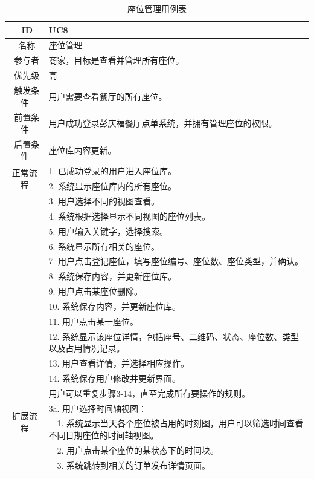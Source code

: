 \begin{table}[htbp!]
  \footnotesize
  \centering
  \caption{座位管理用例表}
  \vspace{2mm}
  \begin{tabular}{cp{11.5cm}}
   \hline
   \ ID & UC8 \\ 
   \hline
   \ 名称 & 座位管理 \\ 
   \hline
   \ 参与者 & 商家，目标是查看并管理所有座位。 \\ 
   \hline
   \ 优先级 & 高 \\ 
   \hline
   \ 触发条件 & 用户需要查看餐厅的所有座位。 \\ 
   \hline
   \ 前置条件 & 用户成功登录彭庆福餐厅点单系统，并拥有管理座位的权限。 \\ 
   \hline
   \ 后置条件 & 座位库内容更新。 \\ 
   \hline
   \multirow{2}{*}{正常流程}
    & 1.	已成功登录的用户进入座位库。\\
    & 2.	系统显示座位库内的所有座位。\\
    & 3.	用户选择不同的视图查看。\\
    & 4.	系统根据选择显示不同视图的座位列表。\\
    & 5.  用户输入关键字，选择搜索。\\
    & 6.  系统显示所有相关的座位。\\
    & 7.  用户点击登记座位，填写座位编号、座位数、座位类型，并确认。\\
    & 8.  系统保存内容，并更新座位库。\\
    & 9.	用户点击某座位删除。\\
    & 10.	系统保存内容，并更新座位库。\\
    & 11.  用户点击某一座位。\\
    & 12.  系统显示该座位详情，包括座号、二维码、状态、座位数、类型以及占用情况记录。\\
    & 13.  用户查看详情，并选择相应操作。\\
    & 14.  系统保存用户修改并更新界面。\\
    & 用户可以重复步骤3-14，直至完成所有要操作的规则。\\
   \hline
   \multirow{2}{*}{扩展流程}
    & 3a. 用户选择时间轴视图：\\
    & ~~1.	系统显示当天各个座位被占用的时刻图，用户可以筛选时间查看不同日期座位的时间轴视图。\\
    & ~~2.	用户点击某个座位的某状态下的时间块。\\
    & ~~3.	系统跳转到相关的订单发布详情页面。\\

\end{tabular}
\end{table}
